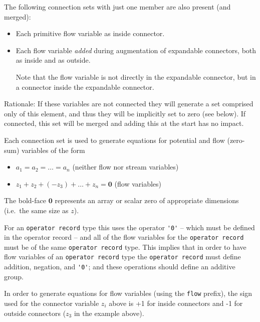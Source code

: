 The following connection sets with just one member are also present (and merged):
\begin{itemize}
\item
  Each primitive flow variable as inside connector.
\item
  Each flow variable \emph{added} during augmentation of expandable connectors, both as inside and as outside.
  \begin{nonnormative}
  Note that the flow variable is not directly in the expandable connector, but in a connector inside the expandable connector.
  \end{nonnormative}
\end{itemize}

\begin{nonnormative}
Rationale: If these variables are not connected they will generate a set comprised only of this element, and thus they will be implicitly set to zero (see below).
If connected, this set will be merged and adding this at the start has no impact.
\end{nonnormative}

Each connection set is used to generate equations for potential and flow (zero-sum) variables of the form
\begin{itemize}
\item
  $a_{1} = a_{2} = \ldots = a_{n}$ (neither flow nor stream variables)
\item
  $z_{1} + z_{2} + (-z_{3}) + \ldots + z_{n} = \mathbf{0}$ (flow variables)
\end{itemize}

The bold-face $\mathbf{0}$ represents an array or scalar zero of appropriate dimensions (i.e.\ the same size as $z$).

For an \lstinline!operator record! type this uses the operator \lstinline!'0'! -- which must be defined in the operator record -- and all of the flow variables for the \lstinline!operator record!
must be of the same \lstinline!operator record! type.
This implies that in order to have flow variables of an \lstinline!operator record! type the \lstinline!operator record! must define addition, negation, and \lstinline!'0'!; and these operations should define an additive group.

In order to generate equations for flow variables (using the \lstinline!flow! prefix), the sign used for the connector variable $z_{i}$ above is +1 for inside connectors and -1 for outside connectors ($z_{3}$ in the example above).

